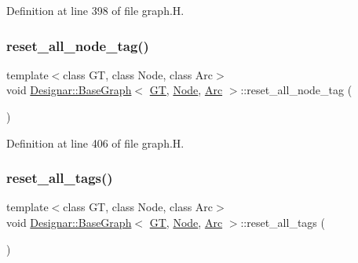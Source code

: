 Definition at line 398 of file graph.\+H.

\mbox{\label{class_designar_1_1_base_graph_a7bffa4f055b15f76d12bd7c40730a3dd}} 
\subsubsection{\texorpdfstring{reset\+\_\+all\+\_\+node\+\_\+tag()}{reset\_all\_node\_tag()}\hspace{0.1cm}{\footnotesize\ttfamily [2/2]}}
{\footnotesize\ttfamily template$<$class GT, class Node, class Arc$>$ \\
void \hyperlink{class_designar_1_1_base_graph}{Designar\+::\+Base\+Graph}$<$ \hyperlink{demo-buildgraph_8_c_a3001c40d2c31ca87ed96cd7d1334a55e}{GT}, \hyperlink{namespace_designar_a5af326c65aa2bd26b26c410f2030d09e}{Node}, \hyperlink{namespace_designar_a3f55fb5513d62ff47cbc8f72b8e95d6f}{Arc} $>$\+::reset\+\_\+all\+\_\+node\+\_\+tag (\begin{DoxyParamCaption}{ }\end{DoxyParamCaption})\hspace{0.3cm}{\ttfamily [inline]}}



Definition at line 406 of file graph.\+H.

\mbox{\label{class_designar_1_1_base_graph_ae62e72668468a2aaa3ddc91246e1ee1c}} 
\subsubsection{\texorpdfstring{reset\+\_\+all\+\_\+tags()}{reset\_all\_tags()}}
{\footnotesize\ttfamily template$<$class GT, class Node, class Arc$>$ \\
void \hyperlink{class_designar_1_1_base_graph}{Designar\+::\+Base\+Graph}$<$ \hyperlink{demo-buildgraph_8_c_a3001c40d2c31ca87ed96cd7d1334a55e}{GT}, \hyperlink{namespace_designar_a5af326c65aa2bd26b26c410f2030d09e}{Node}, \hyperlink{namespace_designar_a3f55fb5513d62ff47cbc8f72b8e95d6f}{Arc} $>$\+::reset\+\_\+all\+\_\+tags (\begin{DoxyParamCaption}{ }\end{DoxyParamCaption})\hspace{0.3cm}{\ttfamily [inline]}}



